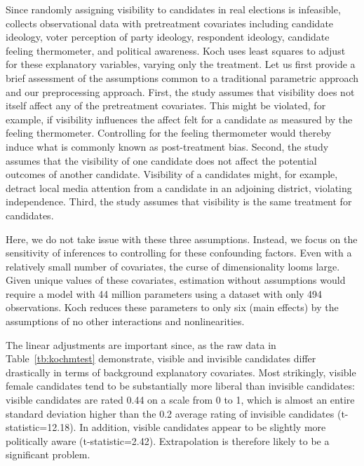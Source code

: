 \documentclass[11pt,titlepage]{article}
\begin{document}
Since randomly assigning visibility to candidates in real elections is
infeasible, \citet{Koch02} collects observational data with
pretreatment covariates including candidate ideology, voter perception
of party ideology, respondent ideology, candidate feeling thermometer,
and political awareness.  Koch uses least squares to adjust for these
explanatory variables, varying only the treatment.  Let us first
provide a brief assessment of the assumptions common to a traditional
parametric approach and our preprocessing approach.  First, the study
assumes that visibility does not itself affect any of the pretreatment
covariates.  This might be violated, for example, if visibility
influences the affect felt for a candidate as measured by the feeling
thermometer.  Controlling for the feeling thermometer would thereby
induce what is commonly known as post-treatment bias.  Second, the
study assumes that the visibility of one candidate does not affect the
potential outcomes of another candidate.  Visibility of a candidates
might, for example, detract local media attention from a candidate in
an adjoining district, violating independence.  Third, the study
assumes that visibility is the same treatment for candidates.

Here, we do not take issue with these three assumptions.  Instead, we
focus on the sensitivity of inferences to controlling for these
confounding factors.  Even with a relatively small number of
covariates, the curse of dimensionality looms large.  Given unique
values of these covariates, estimation without assumptions would
require a model with 44 million parameters using a dataset with only
494 observations.  Koch reduces these parameters to only six (main
effects) by the assumptions of no other interactions and
nonlinearities.

The linear adjustments are important since, as the raw data in
Table~\ref{tb:kochmtest} demonstrate, visible and invisible candidates
differ drastically in terms of background explanatory covariates.
Most strikingly, visible female candidates tend to be substantially
more liberal than invisible candidates: visible candidates are rated
0.44 on a scale from 0 to 1, which is almost an entire standard
deviation higher than the 0.2 average rating of invisible candidates
(t-statistic=12.18).  In addition, visible candidates appear to be
slightly more politically aware (t-statistic=2.42).  Extrapolation is
therefore likely to be a significant problem.
\end{document}
